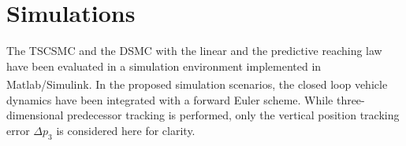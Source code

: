 \documentclass{ifacconf}
\providecommand{\mbf}[1]{\mathbf{#1}}
\newcommand{\idxPredecessor}{{\ensuremath{i-1} }}
\newcommand{\idxAxis}{{\ensuremath{p}}}
\begin{document}
\section{Simulations}
\label{sec:simulations}
The TSCSMC and the DSMC with the linear and the predictive reaching law have been evaluated in a simulation environment implemented in Matlab\textsuperscript{\tiny \textregistered}/Simulink\textsuperscript{\tiny \textregistered}. In the proposed simulation scenarios, the closed loop vehicle dynamics have been integrated with a forward Euler scheme. While three-dimensional predecessor tracking is performed, only the vertical position tracking error $\Delta p_3$ is considered here for clarity.




\end{document}

